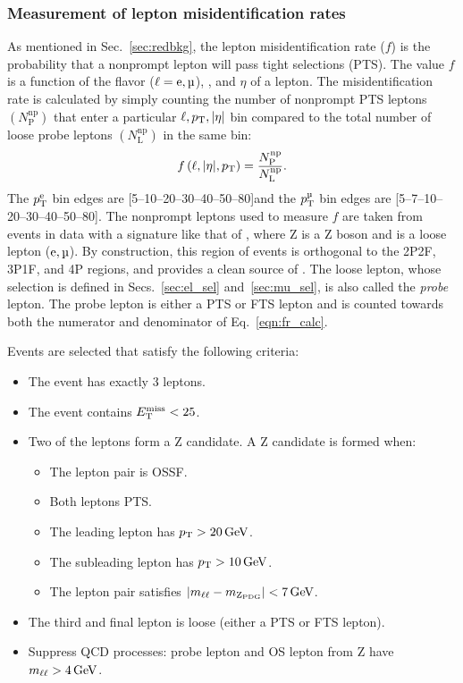 \subsubsection{Measurement of lepton misidentification rates}
\label{sec:fr_evtsel}
As mentioned in Sec.~\ref{sec:redbkg}, the lepton misidentification rate ($f$) is the probability that a nonprompt lepton will pass tight selections (PTS).
The value $f$ is a function of the flavor ($\ell = \text{e}, \Pmu$), \pt, and $\eta$ of a lepton.
The misidentification rate is calculated by simply counting the number of nonprompt PTS leptons $\left( N^{\mathrm{np}}_{\mathrm{P}} \right)$ that enter a particular $\ell, p_{\mathrm{T}}, \lvert \eta \rvert$ bin compared to the total number of loose probe leptons $\left( N^{\mathrm{np}}_{\mathrm{L}} \right)$ in the same bin:
\begin{equation}
	\label{eqn:fr_calc}
	f\left( \ell, \lvert \eta \rvert, p_{\mathrm{T}} \right) = 
	\frac{
		N^{\mathrm{np}}_{\mathrm{P}}
		}{
		N^{\mathrm{np}}_{\mathrm{L}}
		}.
\end{equation}
The $p_{\mathrm{T}}^\mathrm{e}$ bin edges are [5--10--20--30--40--50--80]\GeV and the $\pt^{\Pmu}$ bin edges are [5--7--10--20--30--40--50--80]\GeV.
The nonprompt leptons used to measure $f$ are taken from events in data with a signature like that of \ZplusL, where Z is a Z boson and \looselep is a loose lepton ($\Pe, \Pmu$).
By construction, this region of events is orthogonal to the 2P2F, 3P1F, and 4P regions, and provides a clean source of \looselep.
The loose lepton, whose selection is defined in Secs.~\ref{sec:el_sel} and~\ref{sec:mu_sel}, is also called the \emph{probe} lepton.
The probe lepton is either a PTS or FTS lepton and is counted towards both the numerator and denominator of Eq.~\ref{eqn:fr_calc}. 

Events are selected that satisfy the following criteria:
\begin{itemize}
	\item The event has exactly 3 leptons.
	\item The event contains $E_{\mathrm{T}}^{\text{miss}} < 25$\GeV.
	\item Two of the leptons form a Z candidate. A Z candidate is formed when:
	\begin{itemize}
		\item The lepton pair is OSSF.
		\item Both leptons PTS.
		\item The leading lepton has $p_{\mathrm{T}} > 20\,\text{Ge\hspace{-.08em}V}$.
		\item The subleading lepton has $p_{\mathrm{T}} > 10\,\text{Ge\hspace{-.08em}V}$.
		\item The lepton pair satisfies $\left| m_{\ell\ell} - m_{\text{Z}_{\text{PDG}}} \right| < 7\,\text{Ge\hspace{-.08em}V}$.
	\end{itemize}
	\item The third and final lepton is loose (\ie either a PTS or FTS lepton).
	\item Suppress QCD processes: probe lepton and OS lepton from Z have $m_{\ell\ell} > 4\,\text{Ge\hspace{-.08em}V}$.
\end{itemize}

